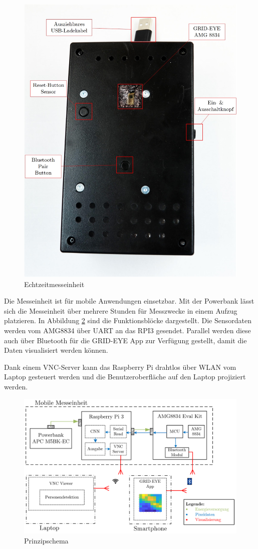 \begin{figure}[H]
	\centering
	\includegraphics[width=0.8\linewidth]{fig/Echtzeitmessgeraet.jpg}
	\caption{Echtzeitmesseinheit}
	\label{fig:einheit1}
\end{figure}

Die Messeinheit ist für mobile Anwendungen einsetzbar. Mit der Powerbank lässt sich die Messeinheit über mehrere Stunden für Messzwecke in einem Aufzug platzieren. In Abbildung \ref{fig:einheit2}  sind die Funktionsblöcke dargestellt. Die Sensordaten werden vom AMG8834 über \ac{UART} an das \ac{RPI3} gesendet. Parallel werden diese auch über Bluetooth für die GRID-EYE App zur Verfügung gestellt, damit die Daten visualisiert werden können.

Dank einem VNC-Server kann das Raspberry Pi drahtlos über WLAN vom Laptop gesteuert werden und die Benutzeroberfläche auf den Laptop projiziert werden. 

\begin{figure}[H]
	\centering
	\includegraphics[width=0.8\linewidth]{fig/Messeinheit.png}
	\caption{Prinzipschema}
	\label{fig:einheit2}
\end{figure}

